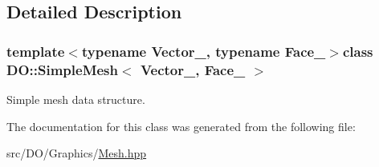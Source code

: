 \subsection{Detailed Description}
\subsubsection*{template$<$typename Vector\-\_\-, typename Face\-\_\-$>$class D\-O\-::\-Simple\-Mesh$<$ Vector\-\_\-, Face\-\_\- $>$}

Simple mesh data structure. 

The documentation for this class was generated from the following file\-:\begin{DoxyCompactItemize}
\item 
src/\-D\-O/\-Graphics/\hyperlink{_mesh_8hpp}{Mesh.\-hpp}\end{DoxyCompactItemize}
